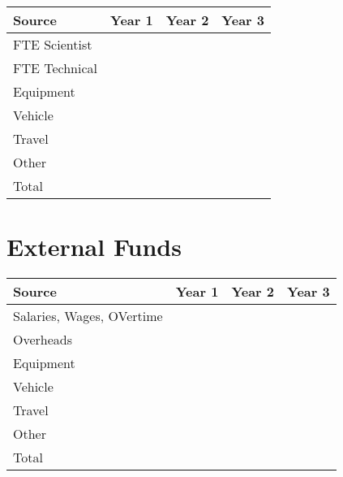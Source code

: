 \documentclass[version=last,
    paper=a4,                               %
    10pt,                                   %
    dvipsnames,
    oneside,                              %
    headings=openany,                       %
    open=any,
    BCOR=7mm,                               %
    DIV=15,     %
]{scrbook}
\begin{document}
\begin{longtabu} to \linewidth { |  X | X | X | X | }
\hline
{}
Source & Year 1 & Year 2 & Year 3\\
\hline
\endhead



FTE Scientist &  &  & \\



FTE Technical &  &  & \\



Equipment &  &  & \\



Vehicle &  &  & \\



Travel &  &  & \\



Other &  &  & \\



Total &  &  & \\


\hline
\end{longtabu}



\section*{External Funds }



\begin{longtabu} to \linewidth { |  X | X | X | X | }
\hline
{}
Source & Year 1 & Year 2 & Year 3\\
\hline
\endhead



Salaries, Wages, OVertime &  &  & \\



Overheads &  &  & \\



Equipment &  &  & \\



Vehicle &  &  & \\



Travel &  &  & \\



Other &  &  & \\



Total &  &  & \\


\hline
\end{longtabu}





\end{document}
